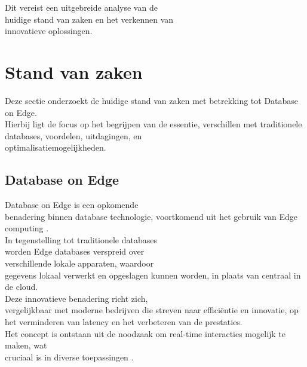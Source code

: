 Dit vereist een uitgebreide analyse van de \\ huidige stand van zaken en het verkennen van \\ innovatieve oplossingen.


\section{Stand van zaken}%
\label{sec:state-of-the-art}

Deze sectie onderzoekt de huidige stand van zaken met betrekking tot Database on Edge. \\

Hierbij ligt de focus op het begrijpen van de essentie, verschillen met traditionele databases, voordelen, uitdagingen,
 en \\ optimalisatiemogelijkheden.

\subsection{Database on Edge}%
\label{subsec:database_on_edge}

Database on Edge is een opkomende \\ benadering binnen database technologie,
 voortkomend uit het gebruik van Edge computing  \cite{Yang2019EdgeDBAE}.  \\
 
In tegenstelling tot traditionele databases \\ worden Edge databases verspreid over \\ verschillende lokale apparaten,
 waardoor \\ gegevens lokaal verwerkt en opgeslagen kunnen worden, in plaats van centraal in de cloud. \\

Deze innovatieve benadering richt zich, \\ vergelijkbaar met moderne bedrijven die streven naar efficiëntie en innovatie,
 op het verminderen van latency en het verbeteren van de prestaties. \\
 
Het concept is ontstaan uit de noodzaak om real-time interacties mogelijk te maken, wat \\ cruciaal is in diverse toepassingen
\cite{Yang2019EdgeDBAE}. \\

